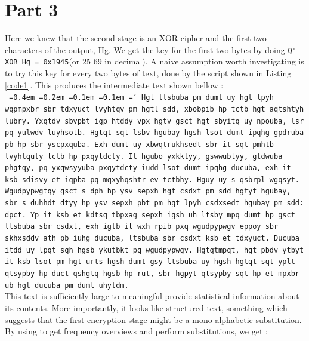 \documentclass[12pt,a4paper,onecolumn]{article}
\newcommand*\justify{%
  \fontdimen2\font=0.4em%
  \fontdimen3\font=0.2em%
  \fontdimen4\font=0.1em%
  \fontdimen7\font=0.1em%
  \hyphenchar\font=`\-%
}
\begin{document}
\section{Part 3}
Here we knew that the second stage is an XOR cipher and the first two characters of the output, Hg. We get the key for the first two bytes by doing \texttt{Q" XOR Hg = 0x1945}(or 25 69 in decimal). A naive assumption worth investigating is to try this key for every two bytes of text, done by the script shown in Listing \ref{code1}. This produces the intermediate text shown bellow : \\

\texttt{\justify {Hgt ltsbuba pm dumt uy hgt lpyh wqpmpxbr sbr tdxyuct lvyhtqv pm hgtl sdd, xbobpib hp tctb hgt aqtshtyh lubry. Yxqtdv sbvpbt igp htddy vpx hgtv gsct hgt sbyitq uy npouba, lsr pq yulwdv luyhsotb. Hgtqt sqt lsbv hgubay hgsh lsot dumt ipqhg gpdruba pb hp sbr yscpxquba. Exh dumt uy xbwqtrukhsedt sbr it sqt pmhtb lvyhtquty tctb hp pxqytdcty. It hgubo yxkktyy, gswwubtyy, gtdwuba phgtqy, pq yxqwsyyuba pxqytdcty iudd lsot dumt ipqhg ducuba, exh it ksb sdisvy et iqpba pq mqxyhqshtr ev tctbhy. Hguy uy s qsbrpl wgqsyt. Wgudpypwgtqy gsct s dph hp ysv sepxh hgt csdxt pm sdd hgtyt hgubay, sbr s duhhdt dtyy hp ysv sepxh pbt pm hgt lpyh csdxsedt hgubay pm sdd: dpct. Yp it ksb et kdtsq tbpxag sepxh igsh uh ltsby mpq dumt hp gsct ltsbuba sbr csdxt, exh igtb it wxh rpib pxq wgudpypwgv eppoy sbr skhxsddv ath pb iuhg ducuba, ltsbuba sbr csdxt ksb et tdxyuct. Ducuba itdd uy lpqt sqh hgsb ykutbkt pq wgudpypwgv. Hgtqtmpqt,  hgt pbdv ytbyt it ksb lsot pm hgt urts hgsh dumt gsy ltsbuba uy hgsh hgtqt sqt yplt qtsypby hp duct qshgtq hgsb hp rut, sbr hgpyt qtsypby sqt hp et mpxbr ub hgt ducuba pm dumt uhytdm.}}\\

This text is sufficiently large to meaningful provide statistical information about its contents. More importantly, it looks like structured text, something which suggests that the first encryption stage might be a mono-alphabetic substitution. By using \citep{tool:design215} to get frequency overviews and perform substitutions, we get : \\
\end{document}
